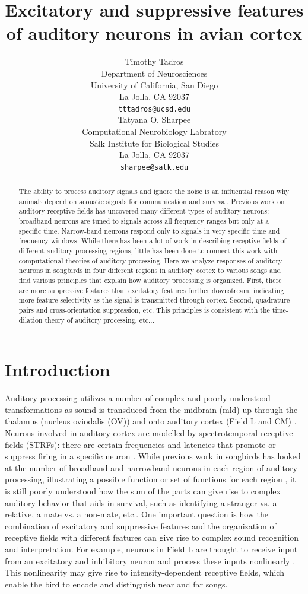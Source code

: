 \documentclass{article}
\title{Excitatory and suppressive features of auditory neurons in avian cortex}
\author{
  Timothy Tadros\\
  Department of Neurosciences\\
  University of California, San Diego\\
  La Jolla, CA 92037 \\
  \texttt{tttadros@ucsd.edu} \\
  \And
  Tatyana O. Sharpee\\
  Computational Neurobiology Labratory\\
  Salk Institute for Biological Studies\\
  La Jolla, CA 92037\\
  \texttt{sharpee@salk.edu}\\
}
\begin{document}

\maketitle

\begin{abstract}
  The ability to process auditory signals and ignore the noise is an influential reason why animals depend on acoustic signals for communication and survival. Previous work on auditory receptive fields has uncovered many different types of auditory neurons: broadband neurons are tuned to signals across all frequency ranges but only at a specific time. Narrow-band neurons respond only to signals in very specific time and frequency windows. While there has been a lot of work in describing receptive fields of different auditory processing regions, little has been done to connect this work with computational theories of auditory processing. Here we analyze responses of auditory neurons in songbirds in four different regions in auditory cortex to various songs and find various principles that explain how auditory processing is organized. First, there are more suppressive features than excitatory features further downstream, indicating more feature selectivity as the signal is transmitted through cortex. Second, quadrature pairs and cross-orientation suppression, etc. This principles is consistent with the time-dilation theory of auditory processing, etc...
\end{abstract}

\section{Introduction}

Auditory processing utilizes a number of complex and poorly understood transformations as sound is transduced from the midbrain (mld) up through the thalamus (nucleus oviodalis (OV)) and onto auditory cortex (Field L and CM) \cite{ondracek2013advances}. Neurons involved in auditory cortex are modelled by spectrotemporal receptive fields (STRFs): there are certain frequencies and latencies that promote or suppress firing in a specific neuron \cite{aertsen1981spectro}. While previous work in songbirds has looked at the number of broadband and narrowband neurons in each region of auditory processing, illustrating a possible function or set of functions for each region \cite{woolley2009functional} \cite{amin2010role} \cite{amin2004neural}, it is still poorly understood how the sum of the parts can give rise to complex auditory behavior that aids in survival, such as identifying a stranger vs. a relative, a mate vs. a non-mate, etc.. One important question is how the combination of excitatory and suppressive features and the organization of receptive fields with different features can give rise to complex sound recognition and interpretation. For example, neurons in Field L are thought to receive input from an excitatory and inhibitory neuron and process these inputs nonlinearly \cite{nagel2008organizing}. This nonlinearity may give rise to intensity-dependent receptive fields, which enable the bird to encode and distinguish near and far songs.
\end{document}
